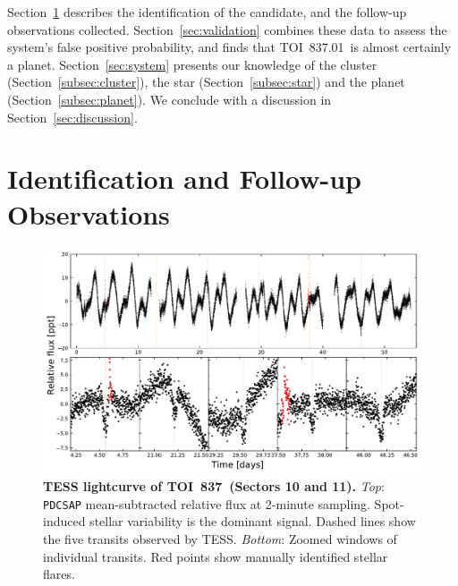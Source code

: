 \documentclass[12pt,twocolumn,tighten]{aastex62}
\newcommand{\tn}{TOI~837} %
\newcommand{\pn}{TOI~837.01} %
\begin{document}
Section~\ref{sec:observations} describes the identification of the
candidate, and the follow-up observations collected.
Section~\ref{sec:validation} combines these data to assess the 
system's false positive probability, and finds that \pn\ is almost
certainly a planet.  Section~\ref{sec:system} presents our knowledge
of the cluster (Section~\ref{subsec:cluster}), the star (Section~\ref{subsec:star})
and the planet (Section~\ref{subsec:planet}).  We conclude
with a discussion in
Section~\ref{sec:discussion}.



\section{Identification and Follow-up Observations}
\label{sec:observations}

\begin{figure}[t!]
	\begin{center}
		\leavevmode
		\includegraphics[width=1\textwidth]{f1.pdf}
	\end{center}
	\vspace{-0.7cm}
	\caption{
    {\bf TESS lightcurve of \tn\ (Sectors 10 and 11).}
    {\it Top}: \texttt{PDCSAP} mean-subtracted relative flux at
    2-minute sampling. Spot-induced stellar variability is the
    dominant signal.  Dashed lines show the five transits observed by
    TESS.
    {\it Bottom}: Zoomed windows of individual transits.  Red points
    show manually identified stellar flares.
		\label{fig:rawzoom}
	}
\end{figure}
\end{document}
